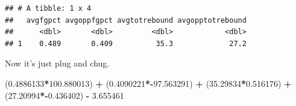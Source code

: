 \documentclass[
]{book}
\newenvironment{Shaded}{\begin{snugshade}}{\end{snugshade}}
\newcommand{\DataTypeTok}[1]{\textcolor[rgb]{0.13,0.29,0.53}{#1}}
\newcommand{\FloatTok}[1]{\textcolor[rgb]{0.00,0.00,0.81}{#1}}
\newcommand{\KeywordTok}[1]{\textcolor[rgb]{0.13,0.29,0.53}{\textbf{#1}}}
\newcommand{\NormalTok}[1]{#1}
\newcommand{\OperatorTok}[1]{\textcolor[rgb]{0.81,0.36,0.00}{\textbf{#1}}}
\newcommand{\StringTok}[1]{\textcolor[rgb]{0.31,0.60,0.02}{#1}}
\begin{document}
\begin{Shaded}
\end{Shaded}

\begin{verbatim}
## # A tibble: 1 x 4
##   avgfgpct avgoppfgpct avgtotrebound avgopptotrebound
##      <dbl>       <dbl>         <dbl>            <dbl>
## 1    0.489       0.409          35.3             27.2
\end{verbatim}

Now it's just plug and chug.

\begin{Shaded}
\begin{Highlighting}[]
\NormalTok{(}\FloatTok{0.4886133}\OperatorTok{*}\FloatTok{100.880013}\NormalTok{) }\OperatorTok{+}\StringTok{ }\NormalTok{(}\FloatTok{0.4090221}\OperatorTok{*-}\FloatTok{97.563291}\NormalTok{) }\OperatorTok{+}\StringTok{ }\NormalTok{(}\FloatTok{35.29834}\OperatorTok{*}\FloatTok{0.516176}\NormalTok{) }\OperatorTok{+}\StringTok{ }\NormalTok{(}\FloatTok{27.20994}\OperatorTok{*-}\FloatTok{0.436402}\NormalTok{) }\OperatorTok{-}\StringTok{ }\FloatTok{3.655461}
\end{Highlighting}
\end{Shaded}
\end{document}
